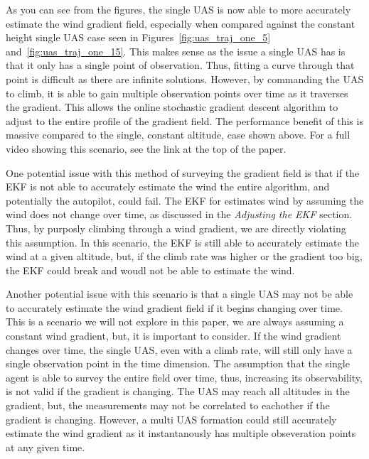 As you can see from the figures, the single UAS is now able to more accurately estimate the wind gradient field, especially when compared against the constant height single UAS case seen in Figures~\ref{fig:uas_traj_one_5} and~\ref{fig:uas_traj_one_15}.
This makes sense as the issue a single UAS has is that it only has a single point of observation.
Thus, fitting a curve through that point is difficult as there are infinite solutions.
However, by commanding the UAS to climb, it is able to gain multiple observation points over time as it traverses the gradient.
This allows the online stochastic gradient descent algorithm to adjust to the entire profile of the gradient field.
The performance benefit of this is massive compared to the single, constant altitude, case shown above.
For a full video showing this scenario, see the link at the top of the paper.

One potential issue with this method of surveying the gradient field is that if the EKF is not able to accurately estimate the wind the entire algorithm, and potentially the autopilot, could fail.
The EKF for estimates wind by assuming the wind does not change over time, as discussed in the \textit{Adjusting the EKF} section.
Thus, by purposly climbing through a wind gradient, we are directly violating this assumption.
In this scenario, the EKF is still able to accurately estimate the wind at a given altitude, but, if the climb rate was higher or the gradient too big, the EKF could break and woudl not be able to estimate the wind.

Another potential issue with this scenario is that a single UAS may not be able to accurately estimate the wind gradient field if it begins changing over time.
This is a scenario we will not explore in this paper, we are always assuming a constant wind gradient, but, it is important to consider.
If the wind gradient changes over time, the single UAS, even with a climb rate, will still only have a single observation point in the time dimension.
The assumption that the single agent is able to survey the entire field over time, thus, increasing its observability, is not valid if the gradient is changing. 
The UAS may reach all altitudes in the gradient, but, the measurements may not be correlated to eachother if the gradient is changing.
However, a multi UAS formation could still accurately estimate the wind gradient as it instantanously has multiple obseveration points at any given time.


